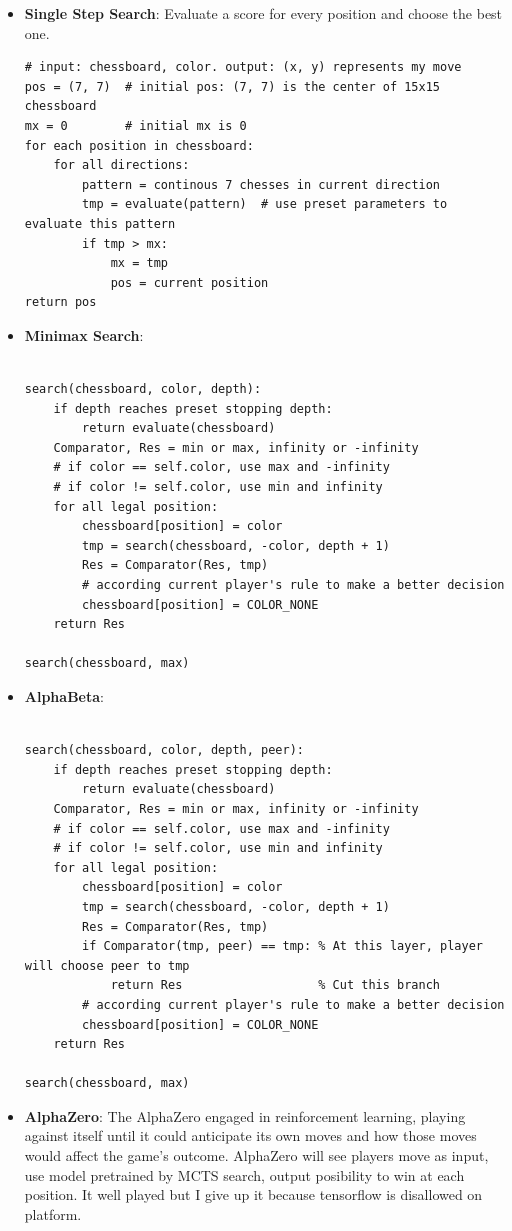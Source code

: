 \documentclass[lang=en,12pt]{elegantpaper}
\begin{document}
\begin{itemize}
  \item {\bf Single Step Search}:
    Evaluate a score for every position and choose the best one.
    \begin{lstlisting}
# input: chessboard, color. output: (x, y) represents my move
pos = (7, 7)  # initial pos: (7, 7) is the center of 15x15 chessboard
mx = 0        # initial mx is 0
for each position in chessboard:
    for all directions:
        pattern = continous 7 chesses in current direction
        tmp = evaluate(pattern)  # use preset parameters to evaluate this pattern
        if tmp > mx:
            mx = tmp
            pos = current position
return pos
    \end{lstlisting}
  \item {\bf Minimax Search}:
    \begin{lstlisting}

search(chessboard, color, depth):
    if depth reaches preset stopping depth:
        return evaluate(chessboard)
    Comparator, Res = min or max, infinity or -infinity
    # if color == self.color, use max and -infinity
    # if color != self.color, use min and infinity
    for all legal position:
        chessboard[position] = color
        tmp = search(chessboard, -color, depth + 1)
        Res = Comparator(Res, tmp)
        # according current player's rule to make a better decision
        chessboard[position] = COLOR_NONE
    return Res

search(chessboard, max)

    \end{lstlisting}

\newpage
  \item {\bf AlphaBeta}:
    \begin{lstlisting}

search(chessboard, color, depth, peer):
    if depth reaches preset stopping depth:
        return evaluate(chessboard)
    Comparator, Res = min or max, infinity or -infinity
    # if color == self.color, use max and -infinity
    # if color != self.color, use min and infinity
    for all legal position:
        chessboard[position] = color
        tmp = search(chessboard, -color, depth + 1)
        Res = Comparator(Res, tmp)
        if Comparator(tmp, peer) == tmp: % At this layer, player will choose peer to tmp
            return Res                   % Cut this branch
        # according current player's rule to make a better decision
        chessboard[position] = COLOR_NONE
    return Res

search(chessboard, max)

    \end{lstlisting}
  \item {\bf AlphaZero}: The AlphaZero engaged in reinforcement learning, playing against itself until it could anticipate its own moves and how those moves would affect the game's outcome.
  \cite{alphazero} AlphaZero will see players move as input,
  use model pretrained by MCTS search,
  output posibility to win at each position.
  It well played but I give up it because tensorflow is disallowed on platform.
\end{itemize}
\end{document}
